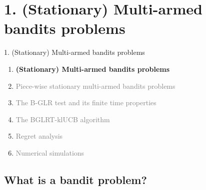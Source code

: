 \documentclass[11pt,english,ignorenonframetext,]{beamer}
\begin{document}
\section{\hfill{}1. (Stationary) Multi-armed bandits problems\hfill{}}

\begin{frame}{1. (Stationary) Multi-armed bandits problems}

  \begin{enumerate}
    \item
    \alert{\textbf{%
      (Stationary) Multi-armed bandits problems
    }}
    \vspace*{15pt}

    \item
    \textcolor{gray}{
      Piece-wise stationary multi-armed bandits problems
    }
    \vspace*{15pt}

    \item
    \textcolor{gray}{
      The B-GLR test and its finite time properties
    }
    \vspace*{15pt}

    \item
    \textcolor{gray}{
      The BGLRT-klUCB algorithm
    }
    \vspace*{15pt}

    \item
    \textcolor{gray}{
      Regret analysis
    }
    \vspace*{15pt}

    \item
    \textcolor{gray}{
      Numerical simulations
    }
  \end{enumerate}

\end{frame}

\subsection{\hfill{}What is a bandit problem?\hfill{}}
\end{document}
